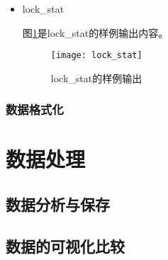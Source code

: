 \begin{itemize}
下面使buddyinfo系统监视器的样例输出内容：
{\footnotesize
\begin{verbatim}
time: 1361881488
Node 0, zone      DMA      0      0      0      1      2      1      1      0      1      1      3   
Node 0, zone    DMA32      8      4      6      7      4      3      5      8      7      3    738 
Node 0, zone   Normal    172    118     51     41     11      3      1      7      1      1      4   
Node 1, zone   Normal     61     66     24      4      0      1      1      9     11      5    922 
time: 1361881489
Node 0, zone      DMA      0      0      0      1      2      1      1      0      1      1      3   
Node 0, zone    DMA32      8      4      6      7      4      3      5      8      7      3    738 
Node 0, zone   Normal    172    118     51     41     11      3      1      7      1      1      4   
Node 1, zone   Normal     99     65     26      5      1      1      1      9     11      5    922 
\end{verbatim}
}
在查询了相关的资料\cite{buddyinfo}之后

\item lock\_stat

图\ref{fig:lock_stat}是lock\_stat的样例输出内容。

\begin{figure}[H]
\centering
\texttt{[image: lock\_stat]}
\caption{lock\_stat的样例输出}
\label{fig:lock_stat}
\end{figure}

\end{itemize}

\subsubsection{数据格式化}

\section{数据处理}

\subsection{数据分析与保存}


\subsection{数据的可视化比较}


